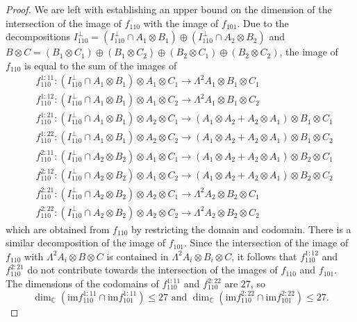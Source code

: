 \documentclass[12pt]{amsart}
\theoremstyle{definition}
\theoremstyle{remark}
\theoremstyle{definition}
\newcommand{\CC}{\mathbb{C}}
\begin{document}
\begin{proof}
We are left with establishing an upper bound on the dimension of the intersection of the image of $f_{110}$ with the image of $f_{101}$.
Due to the decompositions $I_{110}^\perp = (I_{110}^\perp\cap A_1\otimes B_1) \oplus (I_{110}^\perp \cap A_2\otimes B_2)$ 
and $B\otimes C = (B_1\otimes C_1)\oplus (B_1\otimes C_2)\oplus (B_2\otimes C_1)\oplus (B_2\otimes C_2)$, the image of $f_{110}$ is equal to the sum of the images of 
\begin{align*}
    &f_{110}^{1:11}\colon (I_{110}^\perp \cap A_1\otimes B_1) \otimes A_1\otimes C_1 \to \Lambda^2 A_1 \otimes B_1\otimes C_1\\
    &f_{110}^{1:12}\colon (I_{110}^\perp \cap A_1\otimes B_1) \otimes A_1\otimes C_2 \to \Lambda^2 A_1 \otimes B_1\otimes C_2\\
    &f_{110}^{1:21}\colon (I_{110}^\perp \cap A_1\otimes B_1) \otimes A_2\otimes C_1 \to (A_1\otimes A_2 + A_2\otimes A_1) \otimes B_1\otimes C_1 \\
    &f_{110}^{1:22}\colon (I_{110}^\perp \cap A_1\otimes B_1) \otimes A_2\otimes C_2 \to (A_1\otimes A_2 + A_2\otimes A_1) \otimes B_1\otimes C_2\\
    &f_{110}^{2:11}\colon (I_{110}^\perp \cap A_2\otimes B_2) \otimes A_1\otimes C_1 \to (A_1\otimes A_2 + A_2\otimes A_1) \otimes B_2\otimes C_1\\
    &f_{110}^{2:12}\colon (I_{110}^\perp \cap A_2\otimes B_2) \otimes A_1\otimes C_2 \to (A_1\otimes A_2 + A_2\otimes A_1) \otimes B_2\otimes C_2\\
    &f_{110}^{2:21}\colon (I_{110}^\perp \cap A_2\otimes B_2) \otimes A_2\otimes C_1 \to \Lambda^2 A_2 \otimes B_2\otimes C_1 \\
    &f_{110}^{2:22}\colon (I_{110}^\perp \cap A_2\otimes B_2) \otimes A_2\otimes C_2 \to \Lambda^2 A_2 \otimes B_2\otimes C_2
\end{align*}
which are obtained from $f_{110}$ by restricting the domain and codomain. There is a similar decomposition of the image of $f_{101}$. Since the intersection of the image of $f_{110}$ with $\Lambda^2 A_i \otimes B\otimes C$ is contained in $\Lambda^2 A_i \otimes B_i\otimes C$, it follows that $f_{110}^{1:12}$ and $f_{110}^{2:21}$ do not contribute towards the intersection of the images of $f_{110}$ and $f_{101}$. The dimensions of the codomains of $f_{110}^{1:11}$ and $f_{110}^{2:22}$ are $27$, so
\begin{equation}\label{eq:wedge2} 
\dim_\CC (\mathrm{im} f_{110}^{1:11} \cap \mathrm{im} f_{101}^{1:11}) \le 27 \text{ and } \dim_\CC (\mathrm{im} f_{110}^{2:22} \cap \mathrm{im} f_{101}^{2:22})\le 27.
\end{equation}


\end{proof}
\end{document}
